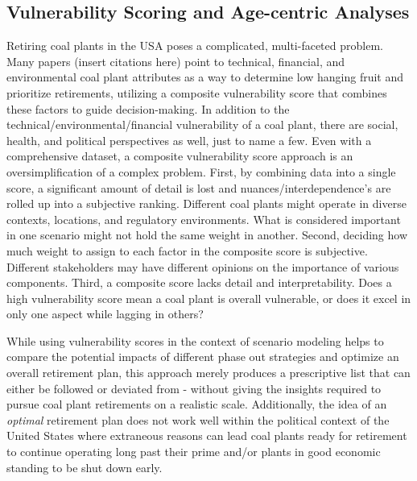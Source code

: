 
\subsection{Vulnerability Scoring and Age-centric Analyses}

Retiring coal plants in the USA poses a complicated, multi-faceted problem. Many papers (insert citations here) point to technical, financial, and environmental 
coal plant attributes as a way to determine low hanging fruit and prioritize retirements, utilizing a composite vulnerability score that combines these factors to guide 
decision-making. In addition to the technical/environmental/financial vulnerability of a coal plant, there are social, health, and political perspectives as well, just 
to name a few. Even with a comprehensive dataset, a composite vulnerability score approach is an oversimplification of a complex problem. 
First, by combining data into a single score, a significant amount of detail is lost and nuances/interdependence's are rolled up into a subjective 
ranking. Different coal plants might operate in diverse contexts, locations, and regulatory environments. What is considered important in 
one scenario might not hold the same weight in another. Second, deciding how much weight to assign to each factor in the composite score is subjective. Different stakeholders may have 
different opinions on the importance of various components. Third, a composite score lacks detail and interpretability. Does a high vulnerability score mean a coal plant is 
overall vulnerable, or does it excel in only one aspect while lagging in others?

While using vulnerability scores in the context of scenario modeling helps to compare the potential impacts of different phase out strategies and 
optimize an overall retirement plan, this approach merely produces a prescriptive list that can either be followed or deviated from - without giving 
the insights required to pursue coal plant retirements on a realistic scale. Additionally, the idea of an \textit{optimal} retirement plan does not work well 
within the political context of the United States where extraneous reasons can lead coal plants ready for retirement to continue operating long 
past their prime and/or plants in good economic standing to be shut down early.

